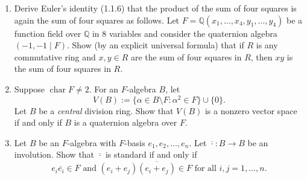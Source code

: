 \documentclass{article}
\theoremstyle{definition}
\begin{document}
\begin{enumerate}
\item[17.] Derive Euler's identity (1.1.6) that the product of the sum of four squares is again the sum of four squares as follows. Let $F = \mathbb{Q}(x_1, \dots, x_4, y_1, \dots, y_4)$ be a function field over $\mathbb{Q}$ in 8 variables and consider the quaternion algebra $(-1, -1 \mid F)$. Show (by an explicit universal formula) that if $R$ is any commutative ring and $x, y \in R$ are the sum of four squares in $R$, then $xy$ is the sum of four squares in $R$.

\item[18.] Suppose $\operatorname{char} F \neq 2$. For an $F$-algebra $B$, let
$$V(B) := \{\alpha \in B \setminus F : \alpha^2 \in F\} \cup \{0\}.$$
Let $B$ be a \emph{central} division ring. Show that $V(B)$ is a nonzero vector space if and only if $B$ is a quaternion algebra over $F$.

\item[19.] Let $B$ be an $F$-algebra with $F$-basis $e_1, e_2, \dots, e_n$. Let $\overline{\cdot}: B \to B$ be an involution. Show that $\overline{\cdot}$ is standard if and only if
$$e_i \overline{e_i} \in F \text{ and } (e_i + e_j)\overline{(e_i + e_j)} \in F \text{ for all } i, j = 1, \dots, n.$$
\end{enumerate}
\end{document}
